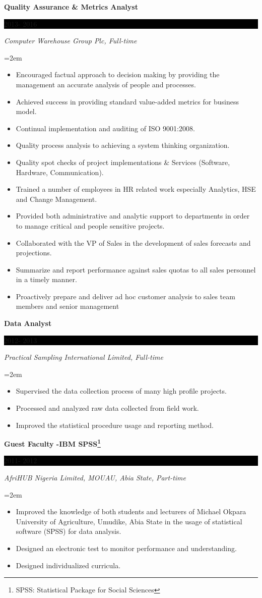 \documentclass[paper=a4,fontsize=10pt]{scrartcl} %
\newcommand{\sepspace}{\vspace*{1em}}       %
\newcommand{\EducationEntry}[4]{
        \noindent \textbf{#1} \hfill      %
        \colorbox{Black}{%
            \parbox{6em}{%
            \hfill\color{White}#2}} \par  %
        \noindent \textit{#3} \par        %
        \noindent\hangindent=2em\hangafter=0 \small #4 %
        \normalsize \par}
\begin{document}
\EducationEntry{Quality Assurance \& Metrics Analyst}{2013- 2016}{Computer Warehouse Group Plc, Full-time}{
	\begin{itemize}
	\item	Encouraged factual approach to decision making by providing the management an accurate analysis of people and processes.
		\item 	Achieved success in providing standard value-added metrics for business model.
	\item 	Continual implementation and auditing of ISO 9001:2008.
	\item 	Quality process analysis to achieving a system thinking organization.
		\item Quality spot checks of project implementations \& Services (Software, Hardware, Communication).
	\item 	Trained a number of employees in HR related work especially Analytics, HSE and Change Management.
		\item Provided both administrative and analytic support to departments in order to manage critical and people sensitive projects.
	\item Collaborated with the VP of Sales in the development of sales forecasts and projections. 
	\item Summarize and report performance against sales quotas to all sales personnel in a timely manner. 
\item 	Proactively prepare and deliver ad hoc customer analysis to sales team members and senior management
	\end{itemize}}

\sepspace


\EducationEntry{Data Analyst}{2012- 2013}{Practical Sampling International Limited, Full-time}{
	\begin{itemize}
		\item Supervised the data collection process of many high profile projects.
		\item Processed and analyzed raw data collected from field work.
		\item 	Improved the statistical procedure usage and reporting method.
	\end{itemize}}


\sepspace


\EducationEntry{Guest Faculty -IBM SPSS\footnote{SPSS: Statistical Package for Social Sciences}}{2011- 2012}{AfriHUB Nigeria Limited, MOUAU, Abia State, Part-time}{
	\begin{itemize}
		\item Improved the knowledge of both students and lecturers of Michael Okpara University of Agriculture, Umudike, Abia State in the usage of statistical software (SPSS) for data analysis.
		\item Designed an electronic test to monitor performance and understanding.
		\item Designed individualized curricula.
	\end{itemize}}
\end{document}
